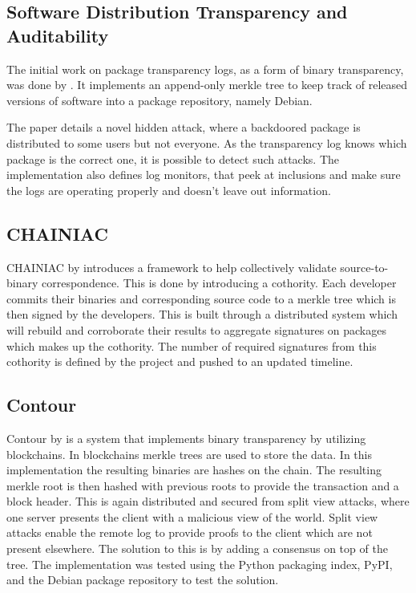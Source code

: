 \documentclass[../Main/thesis.tex]{subfiles}
\begin{document}
\subsection{Software Distribution Transparency and Auditability}\label{sec:benjamin}
The initial work on package transparency logs, as a form of binary transparency,
was done by \citeauthor{1711.07278v1}. It implements an append-only merkle tree to
keep track of released versions of software into a package repository, namely
Debian.\cite{1711.07278v1}

The paper details a novel hidden attack, where a backdoored package is
distributed to some users but not everyone. As the transparency log knows which
package is the correct one, it is possible to detect such attacks. The
implementation also defines log monitors, that peek at inclusions and make
sure the logs are operating properly and doesn't leave out information.


\subsection{CHAINIAC}\label{sec:chainiac}
CHAINIAC by \citeauthor*{kirill-niktin-2017} introduces a framework to help
collectively validate source-to-binary correspondence\cite{kirill-niktin-2017}.
This is done by introducing a cothority.  Each developer commits their binaries
and corresponding source code to a merkle tree which is then signed by the
developers. This is built through a distributed system which will rebuild and
corroborate their results to aggregate signatures on packages which makes up the
cothority. The number of required signatures from this cothority is defined by
the project and pushed to an updated timeline.


\subsection{Contour}\label{sec:contour}
Contour by \citeauthor{1712.08427v2} is a system that implements binary
transparency by utilizing blockchains. In blockchains merkle trees are used to
store the data. In this implementation the resulting binaries are hashes on the
chain. The resulting merkle root is then hashed with previous roots to provide
the transaction and a block header. This is again distributed and secured from
split view attacks, where one server presents the client with a malicious view
of the world. Split view attacks enable the remote log to provide proofs to the
client which are not present elsewhere. The solution to this is by adding a
consensus on top of the tree. The implementation was tested using the Python
packaging index, PyPI, and the Debian package repository to test the
solution.\cite{1712.08427v2}
\end{document}
